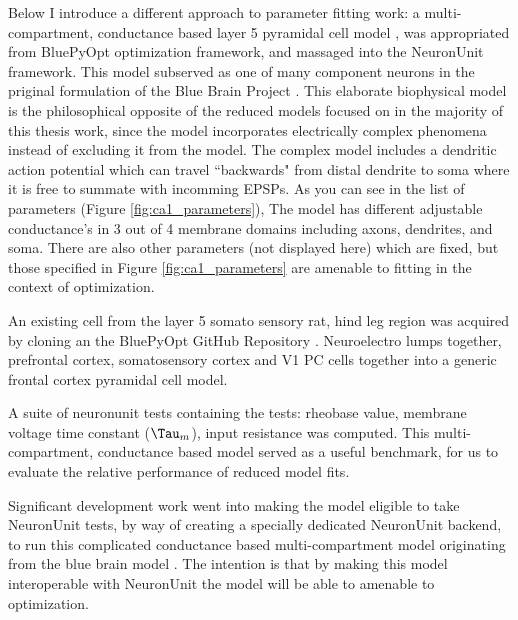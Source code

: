 Below I introduce a different approach to parameter fitting work: a multi-compartment, conductance based layer 5 pyramidal cell model \citep{van2016bluepyopt}, was appropriated from BluePyOpt optimization framework, and massaged into the NeuronUnit framework.
This model subserved as one of many component neurons in the priginal formulation of the Blue Brain Project \cite{markram2015reconstruction}.
This elaborate biophysical model is the philosophical opposite of the reduced models focused on in the majority of this thesis work, since the model incorporates electrically complex phenomena instead of excluding it from the model.
The complex model includes a dendritic action potential which can travel ``backwards" from distal dendrite to soma where it is free to summate with incomming EPSPs.
As you can see in the list of parameters (Figure \ref{fig:ca1_parameters}), The model has different adjustable conductance's in 3 out of 4 membrane domains including axons, dendrites, and soma.
There are also other parameters (not displayed here) which are fixed, but those specified in Figure  \ref{fig:ca1_parameters} are amenable to fitting in the context of optimization.


An existing cell from the layer 5 somato sensory rat, hind leg region was acquired by cloning an the BluePyOpt GitHub Repository \cite{van2016bluepyopt}
. Neuroelectro lumps together, prefrontal cortex, somatosensory cortex and V1 PC cells together into a generic frontal cortex pyramidal cell model. 


%
A suite of neuronunit tests containing the tests: rheobase value, membrane voltage time constant ($\Tau_{m}$), input resistance was computed. This multi-compartment, conductance based model served as a useful benchmark, for us to evaluate the relative performance of reduced model fits. 



Significant development work went into making the model eligible to take NeuronUnit tests, by way of creating a specially dedicated NeuronUnit backend, to run this complicated conductance based multi-compartment model originating from the blue brain model \cite{markram2015reconstruction}. The intention is that by making this model interoperable with NeuronUnit the model will be able to amenable to optimization.


